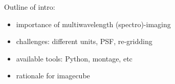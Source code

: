 Outline of intro:

\begin{itemize}
\item importance of multiwavelength (spectro)-imaging
\item challenges: different units, PSF, re-gridding
\item available tools: Python, montage, etc
\item rationale for imagecube
\end{itemize}
